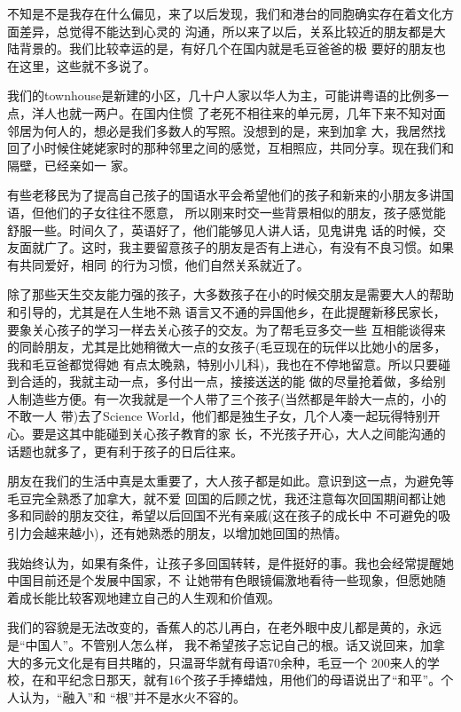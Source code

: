 \documentclass[11pt,a4paper,onecolumn]{article}
\begin{document}
不知是不是我存在什么偏见，来了以后发现，我们和港台的同胞确实存在着文化方面差异，总觉得不能达到心灵的
沟通，所以来了以后，关系比较近的朋友都是大陆背景的。我们比较幸运的是，有好几个在国内就是毛豆爸爸的极
要好的朋友也在这里，这些就不多说了。


我们的townhouse是新建的小区，几十户人家以华人为主，可能讲粤语的比例多一点，洋人也就一两户。在国内住惯
了老死不相往来的单元房，几年下来不知对面邻居为何人的，想必是我们多数人的写照。没想到的是，来到加拿
大，我居然找回了小时候住姥姥家时的那种邻里之间的感觉，互相照应，共同分享。现在我们和隔壁，已经亲如一
家。


有些老移民为了提高自己孩子的国语水平会希望他们的孩子和新来的小朋友多讲国语，但他们的子女往往不愿意，
所以刚来时交一些背景相似的朋友，孩子感觉能舒服一些。时间久了，英语好了，他们能够见人讲人话，见鬼讲鬼
话的时候，交友面就广了。这时，我主要留意孩子的朋友是否有上进心，有没有不良习惯。如果有共同爱好，相同
的行为习惯，他们自然关系就近了。


除了那些天生交友能力强的孩子，大多数孩子在小的时候交朋友是需要大人的帮助和引导的，尤其是在人生地不熟
语言又不通的异国他乡，在此提醒新移民家长，要象关心孩子的学习一样去关心孩子的交友。为了帮毛豆多交一些
互相能谈得来的同龄朋友，尤其是比她稍微大一点的女孩子(毛豆现在的玩伴以比她小的居多，我和毛豆爸都觉得她
有点太晚熟，特别小儿科)，我也在不停地留意。所以只要碰到合适的，我就主动一点，多付出一点，接接送送的能
做的尽量抢着做，多给别人制造些方便。有一次我就是一个人带了三个孩子(当然都是年龄大一点的，小的不敢一人
带)去了Science World，他们都是独生子女，几个人凑一起玩得特别开心。要是这其中能碰到关心孩子教育的家
长，不光孩子开心，大人之间能沟通的话题也就多了，更有利于孩子的日后往来。


朋友在我们的生活中真是太重要了，大人孩子都是如此。意识到这一点，为避免等毛豆完全熟悉了加拿大，就不爱
回国的后顾之忧，我还注意每次回国期间都让她多和同龄的朋友交往，希望以后回国不光有亲戚(这在孩子的成长中
不可避免的吸引力会越来越小)，还有她熟悉的朋友，以增加她回国的热情。


我始终认为，如果有条件，让孩子多回国转转，是件挺好的事。我也会经常提醒她中国目前还是个发展中国家，不
让她带有色眼镜偏激地看待一些现象，但愿她随着成长能比较客观地建立自己的人生观和价值观。


我们的容貌是无法改变的，香蕉人的芯儿再白，在老外眼中皮儿都是黄的，永远是``中国人''。不管别人怎么样，
我不希望孩子忘记自己的根。话又说回来，加拿大的多元文化是有目共睹的，只温哥华就有母语70余种，毛豆一个
200来人的学校，在和平纪念日那天，就有16个孩子手捧蜡烛，用他们的母语说出了``和平''。个人认为，``融入''和
``根''并不是水火不容的。
\end{document}
